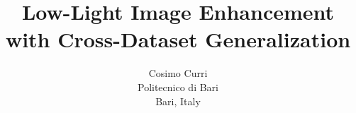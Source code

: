\documentclass[10pt,twocolumn,letterpaper]{article}
\title{Low-Light Image Enhancement with Cross-Dataset Generalization}
\author{
	Cosimo Curri\\
	Politecnico di Bari\\
	Bari, Italy
}
\begin{document}
	\maketitle

	
	
	
	
	
	
	
	
	
	
	

	{
	    \small
	    
	    
	}
\end{document}
